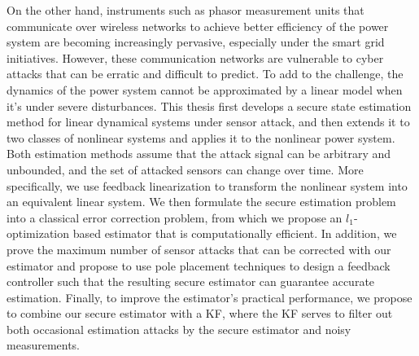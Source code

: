 \documentclass[12pt, oneside, final]{lib/ucthesis}
\begin{document}
\begin{frontmatter}

On the other hand, instruments such as phasor measurement units that communicate over wireless networks to achieve better efficiency of the power system are becoming increasingly pervasive, especially under the smart grid initiatives. 
However, these communication networks are vulnerable to cyber attacks that can be erratic and difficult to predict.
To add to the challenge, the dynamics of the power system cannot be approximated by a linear model when it's under severe disturbances.
This thesis first develops a secure state estimation method for linear dynamical systems under sensor attack, and then extends it to two classes of nonlinear systems and applies it to the nonlinear power system.
Both estimation methods assume that the attack signal can be arbitrary and unbounded, and the set of attacked sensors can change over time.
More specifically, we use feedback linearization to transform the nonlinear system into an equivalent linear system.
We then formulate the secure estimation problem into a classical error correction problem, from which we propose an $l_1$-optimization based estimator that is computationally efficient.
In addition, we prove the maximum number of sensor attacks that can be corrected with our estimator and propose to use pole placement techniques to design a feedback controller such that the resulting secure estimator can guarantee accurate estimation. 
Finally, to improve the estimator's practical performance, we propose to combine our secure estimator with a KF, where the KF serves to  filter out both occasional estimation attacks by the secure estimator and noisy measurements.


\endabstract

\end{frontmatter}
\end{document}
